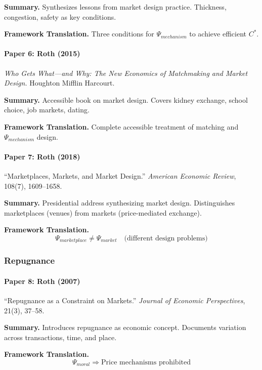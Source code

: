 \textbf{Summary.}
Synthesizes lessons from market design practice. Thickness, congestion, 
safety as key conditions.

\textbf{Framework Translation.}
Three conditions for $\Psi_{mechanism}$ to achieve efficient $C^*$.

\paragraph{Paper 6: Roth (2015)}

\textit{Who Gets What---and Why: The New Economics of Matchmaking and Market Design.}
Houghton Mifflin Harcourt.

\textbf{Summary.}
Accessible book on market design. Covers kidney exchange, school choice, 
job markets, dating.

\textbf{Framework Translation.}
Complete accessible treatment of matching and $\Psi_{mechanism}$ design.

\paragraph{Paper 7: Roth (2018)}

``Marketplaces, Markets, and Market Design.''
\textit{American Economic Review}, 108(7), 1609--1658.

\textbf{Summary.}
Presidential address synthesizing market design. Distinguishes marketplaces 
(venues) from markets (price-mediated exchange).

\textbf{Framework Translation.}
\begin{equation}
\Psi_{marketplace} \neq \Psi_{market} \quad \text{(different design problems)}
\end{equation}

\subsubsection{Repugnance}

\paragraph{Paper 8: Roth (2007)}

``Repugnance as a Constraint on Markets.''
\textit{Journal of Economic Perspectives}, 21(3), 37--58.

\textbf{Summary.}
Introduces repugnance as economic concept. Documents variation across 
transactions, time, and place.

\textbf{Framework Translation.}
\begin{equation}
\Psi_{moral} \Rightarrow \text{Price mechanisms prohibited}
\end{equation}

